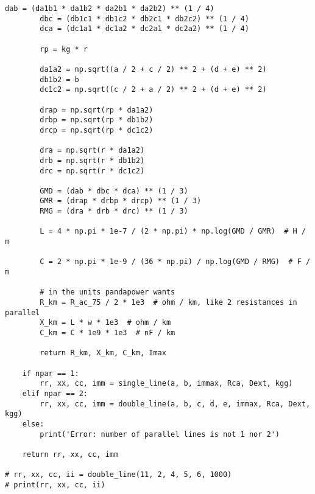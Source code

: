 \begin{lstlisting}[caption={Code for the calculation of lines}]
        dab = (da1b1 * da1b2 * da2b1 * da2b2) ** (1 / 4)
        dbc = (db1c1 * db1c2 * db2c1 * db2c2) ** (1 / 4)
        dca = (dc1a1 * dc1a2 * dc2a1 * dc2a2) ** (1 / 4)

        rp = kg * r

        da1a2 = np.sqrt((a / 2 + c / 2) ** 2 + (d + e) ** 2)
        db1b2 = b
        dc1c2 = np.sqrt((c / 2 + a / 2) ** 2 + (d + e) ** 2)

        drap = np.sqrt(rp * da1a2)
        drbp = np.sqrt(rp * db1b2)
        drcp = np.sqrt(rp * dc1c2)

        dra = np.sqrt(r * da1a2)
        drb = np.sqrt(r * db1b2)
        drc = np.sqrt(r * dc1c2)

        GMD = (dab * dbc * dca) ** (1 / 3)
        GMR = (drap * drbp * drcp) ** (1 / 3)
        RMG = (dra * drb * drc) ** (1 / 3)

        L = 4 * np.pi * 1e-7 / (2 * np.pi) * np.log(GMD / GMR)  # H / m

        C = 2 * np.pi * 1e-9 / (36 * np.pi) / np.log(GMD / RMG)  # F / m

        # in the units pandapower wants
        R_km = R_ac_75 / 2 * 1e3  # ohm / km, like 2 resistances in parallel
        X_km = L * w * 1e3  # ohm / km
        C_km = C * 1e9 * 1e3  # nF / km

        return R_km, X_km, C_km, Imax

    if npar == 1:
        rr, xx, cc, imm = single_line(a, b, immax, Rca, Dext, kgg)
    elif npar == 2:
        rr, xx, cc, imm = double_line(a, b, c, d, e, immax, Rca, Dext, kgg)
    else:
        print('Error: number of parallel lines is not 1 nor 2')

    return rr, xx, cc, imm

# rr, xx, cc, ii = double_line(11, 2, 4, 5, 6, 1000)
# print(rr, xx, cc, ii)

\end{lstlisting}
